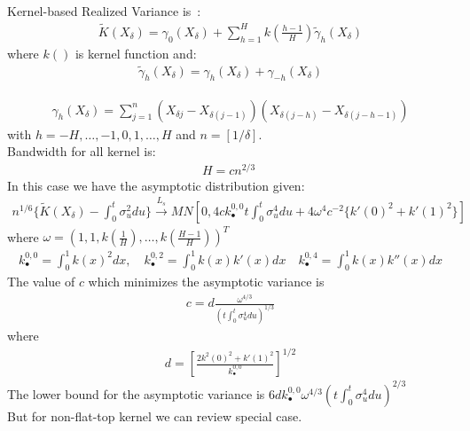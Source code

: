 \documentclass[letterpaper]{report}
\newcounter{N}
\begin{document}
Kernel-based Realized Variance is~\cite[Barndorff-Nielsen et al., 2006]{BarndorffNielsen_Hansen_Lunde_Shephard}:
\begin{gather}
\tilde{K}(X_{\delta})=\gamma_0 (X_{\delta})+ \sum_{h=1}^H k\left(\frac{h-1}{H}\right)\tilde{\gamma}_h(X_{\delta})
\end{gather}
\noindent where $k()$ is kernel function and:
\begin{gather}
\tilde{\gamma}_h (X_{\delta}) = \gamma_h (X_\delta) + \gamma_{-h}(X_{\delta})
\end{gather}

\begin{gather}
\gamma_h (X_{\delta}) = \sum_{j=1}^n (X_{\delta j} - X_{\delta (j-1)})(X_{\delta (j-h)}-X_{\delta (j-h-1)})
\end{gather}
\noindent with $h = -H, \ldots, -1,0,1, \ldots, H$ and $n = [1/\delta]$.\\

\noindent Bandwidth for all kernel is:
\begin{gather}
H = cn^{2/3}\;
\end{gather}
\noindent In this case we have the asymptotic distribution given:
\begin{gather}
n^{1/6}\{\tilde{K}(X_{\delta}) - \int_0^t \sigma_u^2 du\}\stackrel{L_s}{\to} MN \left[0,4 ck^{0,0}_{\bullet} t \int_0^t \sigma_u^4 du + 4\omega^4 c^{-2} \{k'(0)^2 + k'(1)^2\}\right] 
\end{gather}
\noindent where $\omega = (1,1,k(\frac{1}{H}), \ldots, k\left(\frac{H-1}{H}\right))^T$
\begin{gather}
k_{\bullet}^{0,0} = \int_0^1 k(x)^2 dx, \quad k_{\bullet}^{0,2} = \int_0^1 k(x)k'(x) dx \quad k_{\bullet}^{0,4} = \int_0^1 k(x)k''(x) dx
\end{gather}
\noindent The value of $c$ which minimizes the asymptotic variance is
\begin{gather}
c = d \frac {\omega^{4/3}}{(t\int_0^t \sigma_u^4 du)^{1/3}}
\end{gather}
\noindent where
\begin{gather}
d = \left[\frac{2{k^2(0)^2+k'(1)^2}}{k_{\bullet}^{0,0}}\right]^{1/2}
\end{gather}
\noindent The lower bound for the asymptotic variance is $6 dk_{\bullet}^{0,0}
\omega^{4/3} (t \int_0^t \sigma_u^4 du)^{2/3}$\\

\noindent But for non-flat-top kernel we can review special case.\\
\end{document}
